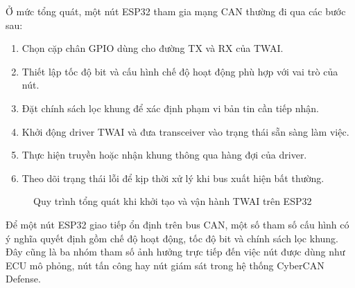 
Ở mức tổng quát, một nút ESP32 tham gia mạng CAN thường đi qua các bước sau:

\begin{enumerate}
    \item Chọn cặp chân GPIO dùng cho đường TX và RX của TWAI.
    \item Thiết lập tốc độ bit và cấu hình chế độ hoạt động phù hợp với vai trò của nút.
    \item Đặt chính sách lọc khung để xác định phạm vi bản tin cần tiếp nhận.
    \item Khởi động driver TWAI và đưa transceiver vào trạng thái sẵn sàng làm việc.
    \item Thực hiện truyền hoặc nhận khung thông qua hàng đợi của driver.
    \item Theo dõi trạng thái lỗi để kịp thời xử lý khi bus xuất hiện bất thường.
\end{enumerate}

\begin{figure}[H]
\centering
{}
\caption{Quy trình tổng quát khi khởi tạo và vận hành TWAI trên ESP32}
\end{figure}


Để một nút ESP32 giao tiếp ổn định trên bus CAN, một số tham số cấu hình có ý nghĩa quyết
định gồm chế độ hoạt động, tốc độ bit và chính sách lọc khung. Đây cũng là ba nhóm tham
số ảnh hưởng trực tiếp đến việc nút được dùng như ECU mô phỏng, nút tấn công hay nút
giám sát trong hệ thống CyberCAN Defense.

